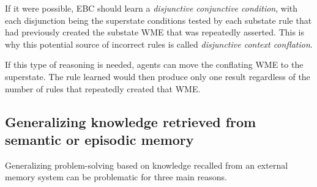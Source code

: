 If it were possible, EBC should learn a \textit{disjunctive conjunctive condition}, with each disjunction being the superstate conditions tested by each substate rule that had previously created the substate WME that was repeatedly asserted.  This is why this potential source of incorrect rules is called \textit{disjunctive context conflation}.

If this type of reasoning is needed, agents can move the conflating WME to the superstate.  The rule learned would then produce only one result regardless of the number of rules that repeatedly created that WME.

\subsection{\texorpdfstring{Generalizing knowledge retrieved from \\ semantic or episodic memory}{Generalizing retrieved knowledge}}

Generalizing problem-solving based on knowledge recalled from an external memory system can be problematic for three main reasons.

